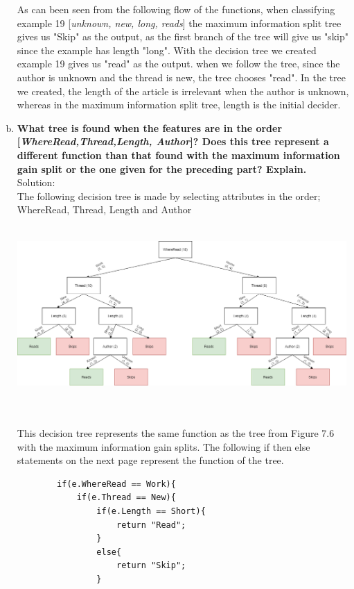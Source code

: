\documentclass{article}
\begin{document}
\begin{enumerate}[(a)]
        As can been seen from the following flow of the functions, when classifying example 19 [\emph{unknown, new, long, reads}] the maximum information split tree gives us "Skip" as the output, as the first branch of the tree will give us "skip" since the example has length "long". With the decision tree we created example 19 gives us "read" as the output. when we follow the tree, since the author is unknown and the thread is new, the tree chooses "read". In the tree we created, the length of the article is irrelevant when the author is unknown, whereas in the maximum information split tree, length is the initial decider.
        \newpage
    \item \textbf{What tree is found when the features are in the order [\emph{WhereRead,Thread,Length, Author}]? Does this tree represent a different function than that found with the maximum information gain split or the one given for the preceding part? Explain.} \\Solution:\\
    The following decision tree is made by selecting attributes in the order; WhereRead, Thread, Length and Author
    \begin{center}
    \hspace*{-3cm} \includegraphics[width=475px,height=250px]{tree2.png}
    \end{center}\\
    This decision tree represents the same function as the tree from Figure 7.6 with the maximum information gain splits. The following if then else statements on the next page represent the function of the tree.
    \newpage
    \begin{lstlisting}
        if(e.WhereRead == Work){
            if(e.Thread == New){
                if(e.Length == Short){
                    return "Read";
                }
                else{
                    return "Skip";
                }

\end{lstlisting}
\end{enumerate}
\end{document}
